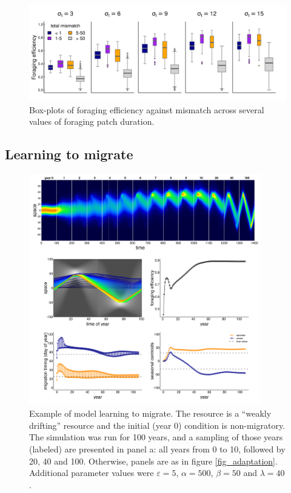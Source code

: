 \documentclass[utf8]{frontiersSCNS} %
\begin{document}
	\begin{figure}
		\includegraphics[width = \textwidth]{figures/ForagingEfficiency.png}
		\caption{\label{fig_boxplotFE} Box-plots of foraging efficiency against mismatch across several values of foraging patch duration.}
	\end{figure}
	
\subsection{Learning to migrate}
	
	\begin{figure}
		\includegraphics[width = 0.9\textwidth]{figures/example2_learningtomigrate.png} 
		
		\caption{\label{fig_learningtomigrate} Example of model learning to migrate. The resource is a ``weakly drifting'' resource and the initial (year 0) condition is non-migratory. The simulation was run for 100 years, and a sampling of those years (labeled) are presented in panel a: all years from 0 to 10, followed by 20, 40 and 100. Otherwise, panels are as in figure \ref{fig_adaptation}. Additional parameter values were $\varepsilon = 5$, $\alpha = 500$, $\beta = 50$ and $\lambda = 40$.}
	\end{figure}
	
\end{document}
